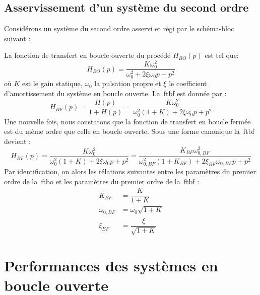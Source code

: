 \subsection{Asservissement d'un système du second ordre}

Considérons un système du second ordre asservi et régi par le schéma-bloc suivant :
\begin{center}
\end{center}
La fonction de transfert en boucle ouverte du procédé $H_{BO}(p)$ est tel que:
$$
H_{BO}(p)=\dfrac{K\omega^2_0}{\omega^2_0+2\xi\omega_0p+p^2}
$$
où $K$ est le gain statique, $\omega_0$ la pulsation propre et $\xi$ 
le coefficient d'amortissement du système en boucle ouverte.
La~\gls{ftbf} est donnée par :
$$
H_{BF}(p)=\dfrac{H(p)}{1+H(p)}=\dfrac{K\omega^2_0}{\omega^2_0(1+K)+2\xi\omega_0p+p^2}
$$
Une nouvelle fois, nous constatons que la fonction de transfert en boucle fermée est du même ordre
que celle en boucle ouverte. Sous une forme canonique la~\gls{ftbf} devient :
$$
H_{BF}(p)=\dfrac{K\omega^2_0}{\omega^2_0(1+K)+2\xi\omega_0p+p^2}=
\dfrac{K_{BF}\omega^2_{0,BF}}{\omega^2_{0,BF}(1+K_{BF})+2\xi_{BF}\omega_{0,BF}p+p^2}
$$
Par identification, on alors les rélations suivantes entre les paramètres du premier ordre 
de la~\gls{ftbo} et les paramètres du premier ordre de la~\gls{ftbf} :
\begin{align*}
       K_{BF}&=\dfrac{K}{1+K}\\
    \omega_{0,BF}&=\omega_0\sqrt{1+K}\\
    \xi_{BF}&=\dfrac{\xi}{\sqrt{1+K}}
\end{align*}

\section{Performances des systèmes en boucle ouverte}

